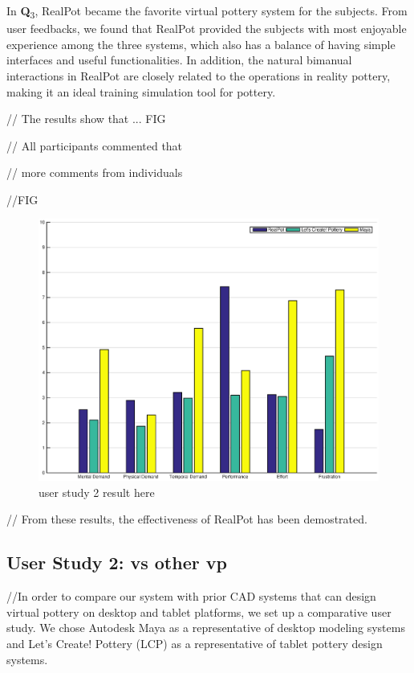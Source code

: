 In \textbf{Q}\textsubscript{3}, RealPot became the favorite virtual pottery system for the subjects. From user feedbacks, we found that RealPot provided the subjects with most enjoyable experience among the three systems, which also has a balance of having simple interfaces and useful functionalities. In addition, the natural bimanual interactions in RealPot are closely related to the operations in reality pottery, making it an ideal training simulation tool for pottery.




// The results show that ... FIG

// All participants commented that

// more comments from individuals

//FIG

\begin{figure}
	\includegraphics[width=\textwidth]{fig14.eps}
	\caption{user study 2 result here}
	\label{fig:u2r}
\end{figure}


// From these results, the effectiveness of RealPot has been demostrated.



\subsection{User Study 2: vs other vp}
\label{sec:study2}

//In order to compare our system with prior CAD systems that can design virtual pottery on desktop and tablet platforms, we set up a comparative user study. We chose Autodesk Maya \cite{website:maya} as a representative of desktop modeling systems and Let's Create! Pottery (LCP) \cite{website:letspottery} as a representative of tablet pottery design systems.


